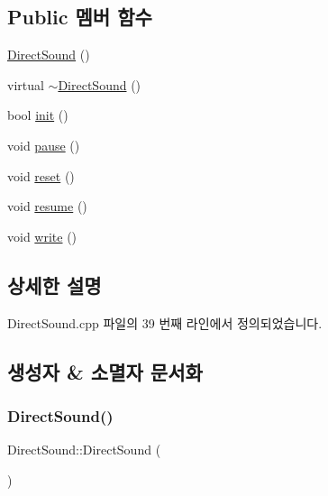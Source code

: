 \subsection*{Public 멤버 함수}
\begin{DoxyCompactItemize}
\item 
\mbox{\hyperlink{class_direct_sound_a79b2ba458690d888eaeee8b047fac5ca}{Direct\+Sound}} ()
\item 
virtual \mbox{\hyperlink{class_direct_sound_af16e30aa30f5c83d614184010ff3ddc8}{$\sim$\+Direct\+Sound}} ()
\item 
bool \mbox{\hyperlink{class_direct_sound_a006583b3b3c1b16ca4c54bf9a6141fb9}{init}} ()
\item 
void \mbox{\hyperlink{class_direct_sound_a33ee46c99ddf8f06bd6605ec14798f4b}{pause}} ()
\item 
void \mbox{\hyperlink{class_direct_sound_aa947e57a1a67df3a609cd403b8c97bb8}{reset}} ()
\item 
void \mbox{\hyperlink{class_direct_sound_a529b060d31bb252968bc9a387a7dc9ad}{resume}} ()
\item 
void \mbox{\hyperlink{class_direct_sound_a2e2a78f3a6719920fb2a9dfc48e4b1db}{write}} ()
\end{DoxyCompactItemize}


\subsection{상세한 설명}


Direct\+Sound.\+cpp 파일의 39 번째 라인에서 정의되었습니다.



\subsection{생성자 \& 소멸자 문서화}
\mbox{\label{class_direct_sound_a79b2ba458690d888eaeee8b047fac5ca}} 
\subsubsection{\texorpdfstring{Direct\+Sound()}{DirectSound()}}
{\footnotesize\ttfamily Direct\+Sound\+::\+Direct\+Sound (\begin{DoxyParamCaption}{ }\end{DoxyParamCaption})}



